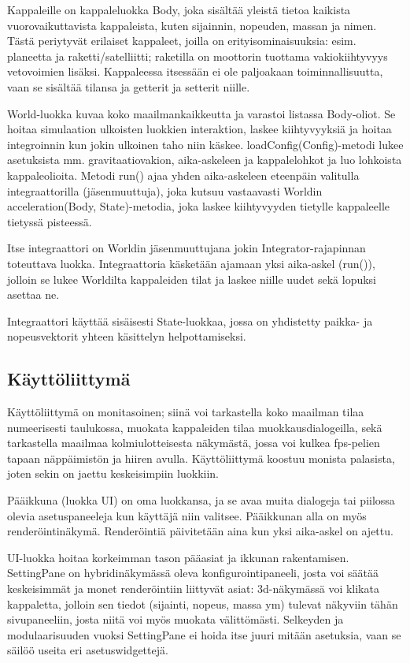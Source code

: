\documentclass[a4paper,11pt]{article}
\begin{document}
Kappaleille on kappaleluokka Body, joka sisältää yleistä tietoa kaikista vuorovaikuttavista kappaleista, kuten sijainnin, nopeuden, massan ja nimen. Tästä periytyvät erilaiset kappaleet, joilla on erityisominaisuuksia: esim. planeetta ja raketti/satelliitti; raketilla on moottorin tuottama vakiokiihtyvyys vetovoimien lisäksi. Kappaleessa itsessään ei ole paljoakaan toiminnallisuutta, vaan se sisältää tilansa ja getterit ja setterit niille.

World-luokka kuvaa koko maailmankaikkeutta ja varastoi listassa Body-oliot. Se hoitaa simulaation ulkoisten luokkien interaktion, laskee kiihtyvyyksiä ja hoitaa integroinnin kun jokin ulkoinen taho niin käskee. loadConfig(Config)-metodi lukee asetuksista mm. gravitaatiovakion, aika-askeleen ja kappalelohkot ja luo lohkoista kappaleolioita. Metodi run() ajaa yhden aika-askeleen eteenpäin valitulla integraattorilla (jäsenmuuttuja), joka kutsuu vastaavasti Worldin acceleration(Body, State)-metodia, joka laskee kiihtyvyyden tietylle kappaleelle tietyssä pisteessä.

Itse integraattori on Worldin jäsenmuuttujana jokin Integrator-rajapinnan toteuttava luokka. Integraattoria käsketään ajamaan yksi aika-askel (run()), jolloin se lukee Worldilta kappaleiden tilat ja laskee niille uudet sekä lopuksi asettaa ne.

Integraattori käyttää sisäisesti State-luokkaa, jossa on yhdistetty paikka- ja nopeusvektorit yhteen käsittelyn helpottamiseksi.


\subsection{Käyttöliittymä}

Käyttöliittymä on monitasoinen; siinä voi tarkastella koko maailman tilaa numeerisesti taulukossa, muokata kappaleiden tilaa muokkausdialogeilla, sekä tarkastella maailmaa kolmiulotteisesta näkymästä, jossa voi kulkea fps-pelien tapaan näppäimistön ja hiiren avulla. Käyttöliittymä koostuu monista palasista, joten sekin on jaettu keskeisimpiin luokkiin.

Pääikkuna (luokka UI) on oma luokkansa, ja se avaa muita dialogeja tai piilossa olevia asetuspaneeleja kun käyttäjä niin valitsee. Pääikkunan alla on myös renderöintinäkymä. Renderöintiä päivitetään aina kun yksi aika-askel on ajettu.

UI-luokka hoitaa korkeimman tason pääasiat ja ikkunan rakentamisen. SettingPane on hybridinäkymässä oleva konfigurointipaneeli, josta voi säätää keskeisimmät ja monet renderöintiin liittyvät asiat: 3d-näkymässä voi klikata kappaletta, jolloin sen tiedot (sijainti, nopeus, massa ym) tulevat näkyviin tähän sivupaneeliin, josta niitä voi myös muokata välittömästi. Selkeyden ja modulaarisuuden vuoksi SettingPane ei hoida itse juuri mitään asetuksia, vaan se säilöö useita eri asetuswidgettejä.
\end{document}
